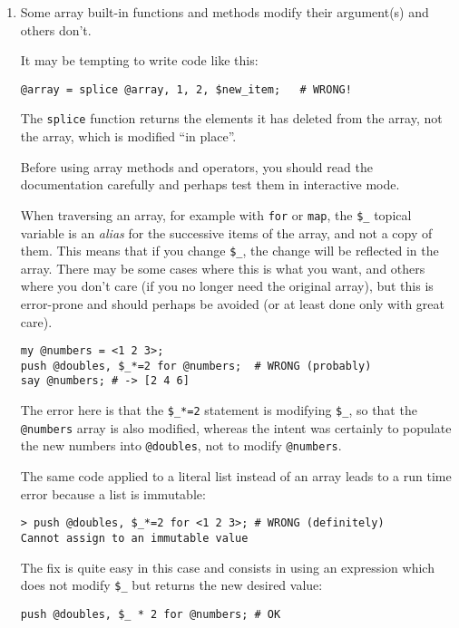 \begin{enumerate}

\item Some array built-in functions and methods modify 
their argument(s) and others don't.

It may be tempting to write code like this:

\begin{verbatim}
@array = splice @array, 1, 2, $new_item;   # WRONG!
\end{verbatim}

The {\tt splice} function returns the elements it has 
deleted from the array, not the array, which is modified 
``in place''.

Before using array methods and operators, you should 
read the documentation carefully and perhaps test them 
in interactive mode.

When traversing an array, for example with {\tt for} 
or {\tt map}, the \verb'$_' topical variable is an 
\emph{alias} for the successive items of the array, and 
not a copy of them. This means that if you change 
\verb'$_', the change will be reflected in the array. 
There may be some cases where this is what you want, 
and others where you don't care (if you no longer need the 
original array), but this is error-prone and should perhaps  
be avoided (or at least done only with great care).

\begin{verbatim}
my @numbers = <1 2 3>;
push @doubles, $_*=2 for @numbers;  # WRONG (probably)
say @numbers; # -> [2 4 6]
\end{verbatim}

The error here is that the \verb'$_*=2' statement is 
modifying \verb'$_', so that the \verb'@numbers' array is 
also modified, whereas the intent was certainly to 
populate the new numbers into \verb'@doubles', not 
to modify \verb'@numbers'.

The same code applied to a literal list instead of an 
array leads to a run time error because a list is 
immutable:

\begin{verbatim}
> push @doubles, $_*=2 for <1 2 3>; # WRONG (definitely)
Cannot assign to an immutable value
\end{verbatim}

The fix is quite easy in this case and consists in 
using an expression which does not modify \verb'$_' 
but returns the new desired value:

\begin{verbatim}
push @doubles, $_ * 2 for @numbers; # OK
\end{verbatim}


\end{enumerate}
